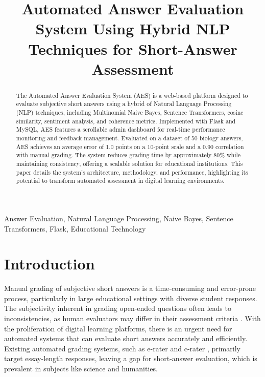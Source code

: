 \documentclass[conference]{IEEEtran}
\title{Automated Answer Evaluation System Using Hybrid NLP Techniques for Short-Answer Assessment}
\author{
    \IEEEauthorblockN{Your Name}
    \IEEEauthorblockA{Department of Computer Science and Engineering \\ Your College Name \\ Your University \\ Email: your.email@example.com}
}
\begin{document}
\maketitle

\begin{abstract}
The Automated Answer Evaluation System (AES) is a web-based platform designed to evaluate subjective short answers using a hybrid of Natural Language Processing (NLP) techniques, including Multinomial Naive Bayes, Sentence Transformers, cosine similarity, sentiment analysis, and coherence metrics. Implemented with Flask and MySQL, AES features a scrollable admin dashboard for real-time performance monitoring and feedback management. Evaluated on a dataset of 50 biology answers, AES achieves an average error of 1.0 points on a 10-point scale and a 0.90 correlation with manual grading. The system reduces grading time by approximately 80\% while maintaining consistency, offering a scalable solution for educational institutions. This paper details the system's architecture, methodology, and performance, highlighting its potential to transform automated assessment in digital learning environments.
\end{abstract}

\begin{IEEEkeywords}
Answer Evaluation, Natural Language Processing, Naive Bayes, Sentence Transformers, Flask, Educational Technology
\end{IEEEkeywords}

\section{Introduction}
Manual grading of subjective short answers is a time-consuming and error-prone process, particularly in large educational settings with diverse student responses. The subjectivity inherent in grading open-ended questions often leads to inconsistencies, as human evaluators may differ in their assessment criteria \cite{burrows2015}. With the proliferation of digital learning platforms, there is an urgent need for automated systems that can evaluate short answers accurately and efficiently. Existing automated grading systems, such as e-rater \cite{attali2006} and c-rater \cite{shermis2013}, primarily target essay-length responses, leaving a gap for short-answer evaluation, which is prevalent in subjects like science and humanities.
\end{document}
